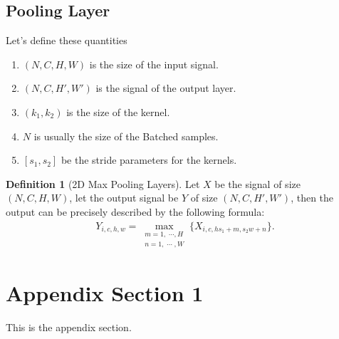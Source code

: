 \documentclass[]{article}
\theoremstyle{definition}
\newtheorem{definition}{Definition}
\numberwithin{equation}{subsection}
\begin{document}
    \subsection{Pooling Layer}
        Let's define these quantities 
        \begin{enumerate}
            \item $(N, C, H, W)$ is the size of the input signal. 
            \item $(N, C, H', W')$ is the signal of the output layer.
            \item $(k_1, k_2)$ is the size of the kernel. 
            \item $N$ is usually the size of the Batched samples. 
            \item $[s_1, s_2]$ be the stride parameters for the kernels. 
        \end{enumerate}
            
        \begin{definition}[2D Max Pooling Layers]
            Let $X$ be the signal of size $(N,C, H, W)$, let the output signal be $Y$ of size $(N, C, H', W')$, then the output can be precisely described by the following formula: 
            {
            \large
            \[
                \begin{aligned}
                    Y_{i,c, h, w} = 
                    \max_{
                        \substack{m = 1, \;\cdots, H\\n = 1, \; \cdots \; , W}
                    }
                    \{
                        X_{i, c, hs_1 + m, s_2w + n}
                    \}. 
                \end{aligned} 
            \]
            }
        \end{definition}
    
    

\appendix
\section{Appendix Section 1}
    This is the appendix section. 





% 
\end{document}
